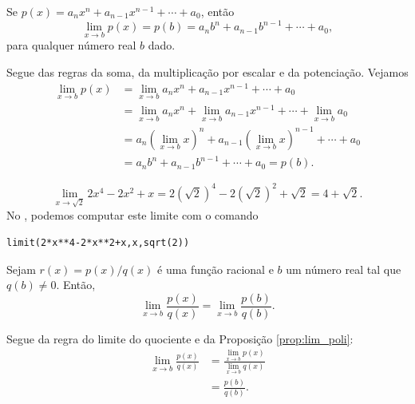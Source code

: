 \begin{prop}\label{prop:lim_poli}
  Se $p(x) = a_nx^n + a_{n-1}x^{n-1} + \cdots + a_0$, então
  \begin{equation}
    \lim_{x\to b} p(x) = p(b) = a_nb^n + a_{n-1}b^{n-1} + \cdots + a_0,
  \end{equation}
  para qualquer número real $b$ dado.
\end{prop}
\begin{dem}
  Segue das regras da soma, da multiplicação por escalar e da potenciação. Vejamos
  \begin{align}
    \lim_{x\to b} p(x) &= \lim_{x\to b} a_nx^n + a_{n-1}x^{n-1} + \cdots + a_0\\
                       &= \lim_{x\to b} a_nx^n + \lim_{x\to b} a_{n-1}x^{n-1} + \cdots + \lim_{x\to b} a_0\\
                       &= a_n\left(\lim_{x\to b} x\right)^n + a_{n-1}\left(\lim_{x\to b} x\right)^{n-1} + \cdots + a_0\\
                       &= a_nb^n + a_{n-1}b^{n-1} + \cdots + a_0 = p(b).
  \end{align}
\end{dem}

\begin{ex}
  \begin{equation}
    \lim_{x\to \sqrt{2}} 2x^4 - 2x^2 + x = 2(\sqrt{2})^4 - 2(\sqrt{2})^2 + \sqrt{2} = 4+\sqrt{2}.
  \end{equation}
  \ifispython
  No \sympy, podemos computar este limite com o comando
\begin{verbatim}
limit(2*x**4-2*x**2+x,x,sqrt(2))
\end{verbatim}
  \fi
\end{ex}

\begin{prop}
  Sejam $r(x) = p(x)/q(x)$ é uma função racional e $b$ um número real tal que $q(b)\neq 0$. Então,
  \begin{equation}
    \lim_{x\to b} \frac{p(x)}{q(x)} = \lim_{x\to b} \frac{p(b)}{q(b)}.
  \end{equation}
\end{prop}
\begin{dem}
  Segue da regra do limite do quociente e da Proposição \ref{prop:lim_poli}:
  \begin{align}
    \lim_{x\to b} \frac{p(x)}{q(x)} &= \frac{\lim_{x\to b} p(x)}{\lim_{x\to b} q(x)} \\
    &= \frac{p(b)}{q(b)}.
  \end{align}
\end{dem}

